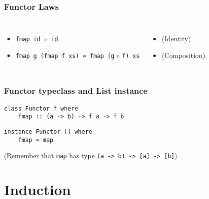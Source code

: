 \documentclass{beamer}
\begin{document}
\begin{frame}[fragile]
    \frametitle {Functor Laws}

\begin{columns}
\begin{itemize}
\item \verb?fmap id = id?
\item \verb?fmap g (fmap f xs) = fmap (g? $\circ$ \verb?f) xs?
\end{itemize}
\begin{itemize}
\item[] (Identity)
\item[] (Composition)
\end{itemize}
\end{columns}

\end{frame}

\begin{frame}[fragile]
    \frametitle {Functor typeclass and List instance}

\begin{verbatim}
class Functor f where
    fmap :: (a -> b) -> f a -> f b 
\end{verbatim}

\begin{verbatim}
instance Functor [] where
    fmap = map
\end{verbatim}

(Remember that \verb?map? has type \verb?(a -> b) -> [a] -> [b]?)

\end{frame}

\section{Induction}
\end{document}
